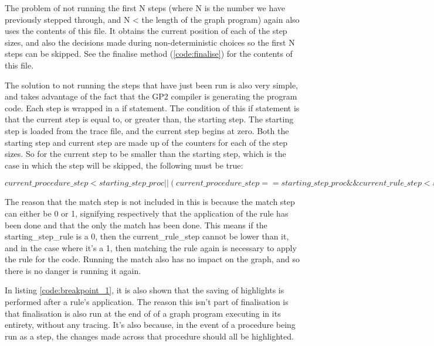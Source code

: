 \documentclass{UoYCSproject}
\begin{document}
The problem of not running the first N steps (where N is the number we have previously stepped through, and N < the length of the graph program) again also uses the contents of this file. It obtains the current position of each of the step sizes, and also the decisions made during non-deterministic choices so the first N steps can be skipped. See the finalise method (\ref{code:finalise}) for the contents of this file.

The solution to not running the steps that have just been run is also very simple, and takes advantage of the fact that the GP2 compiler is generating the program code. Each step is wrapped in a if statement. The condition of this if statement is that the current step is equal to, or greater than, the starting step. The starting step is loaded from the trace file, and the current step begins at zero. Both the starting step and current step are made up of the counters for each of the step sizes. So for the current step to be smaller than the starting step, which is the case in which the step will be skipped, the following must be true:

$current\_procedure\_step < starting\_step\_proc ||
(current\_procedure\_step == starting\_step\_proc \&\& current\_rule\_step < starting\_step\_rule);$

The reason that the match step is not included in this is because the match step can either be 0 or 1, signifying respectively that the application of the rule has been done and that the only the match has been done. This means if the starting\_step\_rule is a 0, then the current\_rule\_step cannot be lower than it, and in the case where it's a 1, then matching the rule again is necessary to apply the rule for the code. Running the match also has no impact on the graph, and so there is no danger is running it again.

In listing \ref{code:breakpoint_1}, it is also shown that the saving of highlights is performed after a rule's application. The reason this isn't part of finalisation is that finalisation is also run at the end of of a graph program executing in its entirety, without any tracing. It's also because, in the event of a procedure being run as a step, the changes made across that procedure should all be highlighted.
\end{document}

